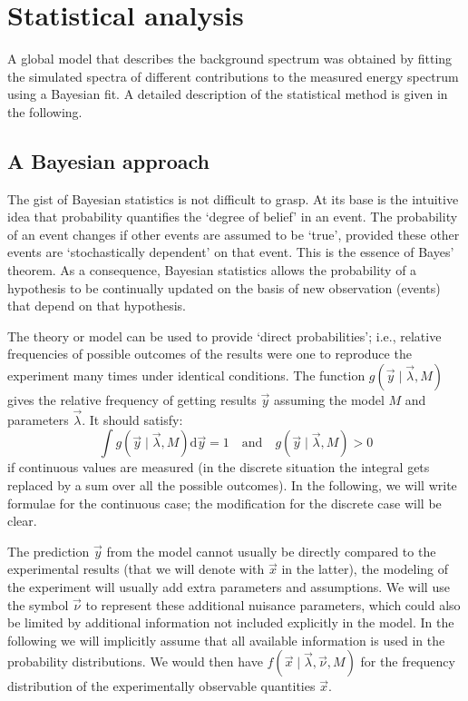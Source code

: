 \section{Statistical analysis}\label{sec:bayes}
A global model that describes the background spectrum was obtained by fitting the simulated spectra of different contributions to the measured energy spectrum using a Bayesian fit. A detailed description of the statistical method is given in the following.
\subsection*{A Bayesian approach}
The gist of Bayesian statistics is not difficult to grasp. At its base is the intuitive idea that probability quantifies the `degree of belief' in an event. The probability of an event changes if other events are assumed to be `true', provided these other events are `stochastically dependent' on that event. This is the essence of Bayes' theorem. As a consequence, Bayesian statistics allows the probability of a hypothesis to be continually updated on the basis of new observation (events) that depend on that hypothesis. 

 The theory or model can be used to provide `direct probabilities'; i.e., relative frequencies of possible outcomes of the results were one to reproduce the experiment many times under identical conditions. The function $g(\vec{y}\mid\vec{\lambda},M)$ gives the relative frequency of getting results $\vec{y}$ assuming the model $M$ and parameters $\vec{\lambda}$. It should satisfy:
\[\int g(\vec{y}\mid\vec{\lambda},M)\text{d}\vec{y}=1 \quad\text{and}\quad g(\vec{y}\mid\vec{\lambda},M)>0\]
if continuous values are measured (in the discrete situation the integral gets replaced by a sum over all the possible outcomes). In the following, we will write formulae for the continuous case; the modification for the discrete case will be clear.

The prediction $\vec{y}$ from the model cannot usually be directly compared to the experimental results (that we will denote with $\vec{x}$ in the latter), the modeling of the experiment will usually add extra parameters and assumptions. We will use the symbol $\vec{\nu}$ to represent these additional nuisance parameters, which could also be limited by additional information not included explicitly in the model. In the following we will implicitly assume that all available information is used in the probability distributions. We would then have $f(\vec{x}\mid\vec{\lambda},\vec{\nu},M)$ for the frequency distribution of the experimentally observable quantities $\vec{x}$.


